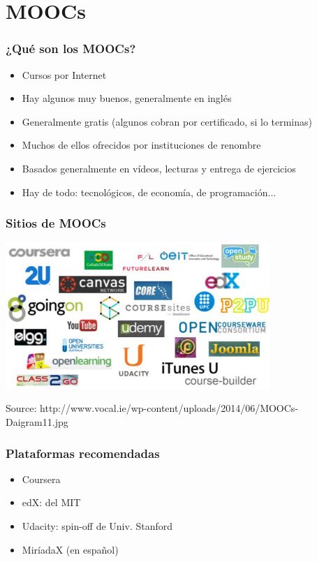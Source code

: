 \section{MOOCs}


\begin{frame}
\frametitle{¿Qué son los MOOCs?}

\begin{itemize}
   \item Cursos por Internet
   \item Hay algunos muy buenos, generalmente en inglés
   \item Generalmente gratis (algunos cobran por certificado, si lo terminas)
   \item Muchos de ellos ofrecidos por instituciones de renombre
   \item Basados generalmente en vídeos, lecturas y entrega de ejercicios
   \item Hay de todo: tecnológicos, de economía, de programación...
\end{itemize}

\end{frame}



\begin{frame}
\frametitle{Sitios de MOOCs}

\begin{center}
  \includegraphics[width=10cm]{figs/sitios.jpg}
\end{center}


\begin{flushright}
{\tiny
Source: http://www.vocal.ie/wp-content/uploads/2014/06/MOOCs-Daigram11.jpg
}
\end{flushright}

\end{frame}


\begin{frame}
\frametitle{Plataformas recomendadas}

\begin{itemize}
   \item Coursera
   \item edX: del MIT
   \item Udacity: spin-off de Univ. Stanford
   \item MiríadaX (en español)
\end{itemize}

\end{frame}



